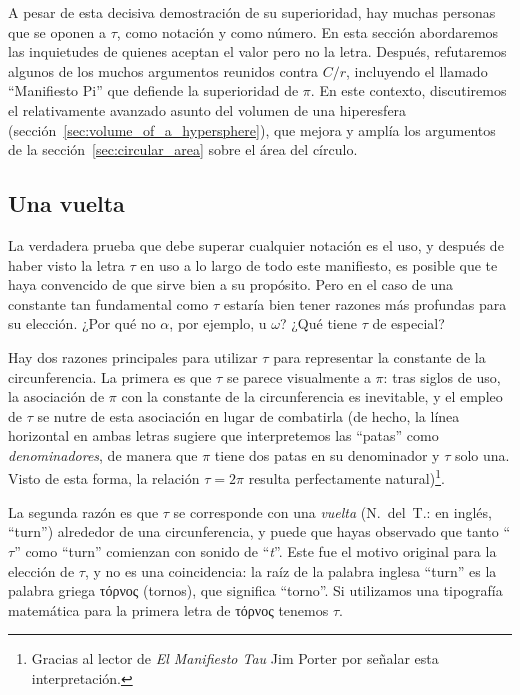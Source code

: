 A pesar de esta decisiva demostración de su superioridad, hay muchas personas que se oponen a $\tau$, como notación y como número. En esta sección abordaremos las inquietudes de quienes aceptan el valor pero no la letra. Después, refutaremos algunos de los muchos argumentos reunidos contra $C/r$, incluyendo el llamado ``Manifiesto Pi'' que defiende la superioridad de $\pi$. En este contexto, discutiremos el relativamente avanzado asunto del volumen de una hiperesfera (sección~\ref{sec:volume_of_a_hypersphere}), que mejora y amplía los argumentos de la sección~\ref{sec:circular_area} sobre el área del círculo.

  \subsection{Una vuelta} %
  \label{sec:one_turn}

La verdadera prueba que debe superar cualquier notación es el uso, y después de haber visto la letra $\tau$ en uso a lo largo de todo este manifiesto, es posible que te haya convencido de que sirve bien a su propósito. Pero en el caso de una constante tan fundamental como $\tau$ estaría bien tener razones más profundas para su elección. ¿Por qué no $\alpha$, por ejemplo, u $\omega$? ¿Qué tiene $\tau$ de especial?

Hay dos razones principales para utilizar $\tau$ para representar la constante de la circunferencia. La primera es que $\tau$ se parece visualmente a $\pi$: tras siglos de uso, la asociación de $\pi$ con la constante de la circunferencia es inevitable, y el empleo de $\tau$ se nutre de esta asociación en lugar de combatirla (de hecho, la línea horizontal en ambas letras sugiere que interpretemos las ``patas'' como \emph{denominadores}, de manera que $\pi$ tiene dos patas en su denominador y $\tau$ solo una. Visto de esta forma, la relación $\tau = 2\pi$ resulta perfectamente natural)\footnote{Gracias al lector de \emph{El Manifiesto Tau} Jim Porter por señalar esta interpretación.}.

La segunda razón es que $\tau$ se corresponde con una \emph{vuelta} (N.~del~T.: en inglés, ``turn'') alrededor de una circunferencia, y puede que hayas observado que tanto ``$\tau$'' como ``turn'' comienzan con sonido de ``\emph{t}''. Este fue el motivo original para la elección de $\tau$, y no es una coincidencia: la raíz de la palabra inglesa ``turn'' es la palabra griega τόρνος (tornos), que significa ``torno''. Si utilizamos una tipografía matemática para la primera letra de τόρνος tenemos $\tau$.

